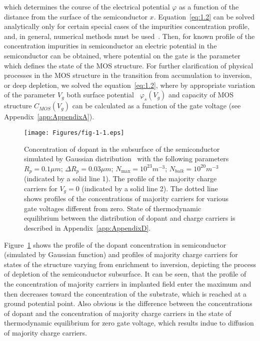 which determines the course of the electrical potential $\varphi$ as a
function of the distance from the surface of the semiconductor
$x$. Equation~\ref{eq:1.2} can be solved analytically only for certain
special cases of the impurities concentration profile, and, in
general, numerical methods must be used~\cite{1.9,1.10}. Then, for
known profile of the concentration impurities in semiconductor an
electric potential in the semiconductor can be obtained, where
potential on the gate is the parameter which defines the state of the
MOS structure. For further clarification of physical processes in the
MOS structure in the transition from accumulation to inversion, or
deep depletion, we solved the equation~\ref{eq:1.2}, where by
appropriate variation of the parameter $V_g$ both surface
potential~ $\varphi_{s}(V_g)$ and capacity of
MOS structure $C_{MOS}(V_g)$ can be calculated as a function of the
gate voltage (see Appendix~\ref{app:AppendixA}).

\begin{figure}[h!]\centering
  \texttt{[image: Figures/fig-1-1.eps]}%
  \caption[Concentration of dopant in the subsurface of the
    semiconductor] {Concentration of dopant in the subsurface of the
    semiconductor simulated by Gaussian distribution~\cite{1.11} with
    the following parameters $R_p=0.1 \mu{m}$;
    $\Delta{R_p}=0.03\mu{m}$; $N_{\max}=10^{23} m^{-3}$;
    $N_{bulk}=10^{20} m^{-3}$ (indicated by a solid line 1). The
    profile of the majority charge carriers for $V_g=0$ (indicated by
    a solid line 2). The dotted line shows profiles of the
    concentrations of majority carriers for various gate voltages
    different from zero. State of thermodynamic equilibrium between
    the distribution of dopant and charge carriers is described in
    Appendix~\ref{app:AppendixD}.}\label{fig:1.1}
\end{figure}

\par Figure~\ref{fig:1.1} shows the profile of the dopant
concentration in semiconductor (simulated by Gaussian function) and
profiles of majority charge carriers for states of the structure
varying from enrichment to inversion, depicting the process of
depletion of the semiconductor subsurface. It can be seen, that the
profile of the concentration of majority carriers in implanted field
enter the maximum and then decreases toward the concentration of the
substrate, which is reached at a ground potential point. Also obvious
is the difference between the concentrations of dopant and the
concentration of majority charge carriers in the state of
thermodynamic equilibrium for zero gate voltage, which results indue
to diffusion of majority charge carriers.

